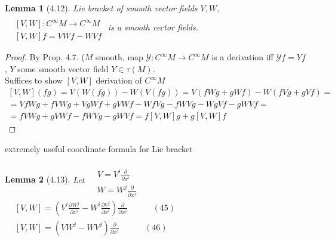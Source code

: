 \documentclass[11pt]{amsart}
\newtheorem{lemma}{Lemma}
\theoremstyle{definition}
\begin{document}
\begin{lemma}[4.12] Lie bracket of smooth vector fields $V,W$, $\begin{aligned} & \quad \\
    & [V, W ] : C^{\infty} M \to C^{\infty} M \\
    & [V, W ] f = VW f - WV f \end{aligned}$ \quad is a smooth vector fields.
\end{lemma}

\begin{proof}
  By Prop. 4.7.  ($M$ smooth, map $\mathcal{Y} : C^{\infty}M \to C^{\infty} M$ is a derivation iff $\mathcal{Y} f = Yf$, $Y$ some smooth vector field $Y \in \tau(M)$.  \\
Suffices to show $[V,W]$ derivation of $C^{\infty}M$
\[
\begin{gathered}
  [V,W] (fg) = V(W(fg)) -  W(V(fg)) = V(fWg + gWf) - W( fVg  + gVf) = \\
   = VfWg + fVW g + Vg Wf + gVWf - WfVg - fWVg - WgVf - gWVf  = \\
   =fVWg + gVWf - fWV g - gWVf = f[V,W] g + g[V,W]f
\end{gathered}
\]
\end{proof}


extremely useful coordinate formula for Lie bracket
\begin{lemma}[4.13]
  Let $\begin{aligned} & \quad \\
    & V = V^i \frac{ \partial }{ \partial x^i} \\
    & W = W^j \frac{ \partial }{ \partial x^j} \end{aligned}$ \quad \quad $\begin{aligned}
    & [V,W] = \left( V^i \frac{ \partial W^j}{ \partial x^i } - W^i \frac{ \partial V^j}{ \partial x^i } \right) \frac{ \partial }{ \partial x^j } \quad \quad \quad (45) \\
    & [V,W]  = (VW^j - WV^j) \frac{\partial }{ \partial x^j} \quad \quad \quad (46) \end{aligned}$

\end{lemma}
\end{document}
